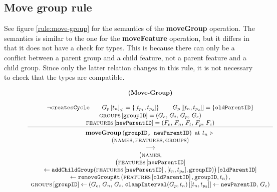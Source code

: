\subsection{Move group rule}
\label{sub:move-group-rule}
See figure \vref{rule:move-group} for the semantics of the \textbf{moveGroup} operation. The semantics is similar to the one for the \textbf{moveFeature} operation, but it differs in that it does not have a check for types. This is because there can only be a conflict between a parent group and a child feature, not a parent feature and a child group. Since only the latter relation changes in this rule, it is not necessary to check that the types are compatible.

\begin{figure}[h]
    \renewcommand{\arraystretch}{1.1}
    \sossize$$\begin{array}{c}
      \ntyperule{Move-Group}
      {\\
        \neg \var{createsCycle} \qquad
        \containing{G_p}{t_n} = \set{\interval{t_{p_1}}{t_{p_2}}} \qquad
        \lookup{G_p}{\interval{t_n}{t_{p_2}}} = \set{\var{oldParentID}} \\
        \lookup{\groups{}}{\var{groupID}} = \group \\
        \lookup{\features{}}{\var{newParentID}} = \feature 
      }
      {
        \textbf{moveGroup}\left( \var{groupID, newParentID}\right) \text{ at } t_n \shove \\
        (\names{}, \features{}, \groups{}) \\
        \transition \\
        \big(\names,\\
        \lookup{\big(\lookup{\features{}}{\var{newParentID}} \\
        \assign \var{addChildGroup}(\lookup{\features{}}{\var{newParentID}}, \interval{t_n}{t_{p_2}}, \var{groupID})\big)}{\var{oldParentID}} \\
        \assign 
      \var{removeGroupAt}\left(\lookup{\features{}}{\var{oldParentID}}, \var{groupID}, t_n\right), \\
        \lookup{\groups{}}{\var{groupID}} \assign \left( G_e,\, G_n,\, G_t,\, 
        \lookup{\var{clampInterval}(G_p, t_n)}{\interval{t_n}{t_{p_2}}} \assign \var{newParentID},\, G_c \right)}
    \end{array}$$
  \caption{\label{rule:move-group}}
\end{figure}


